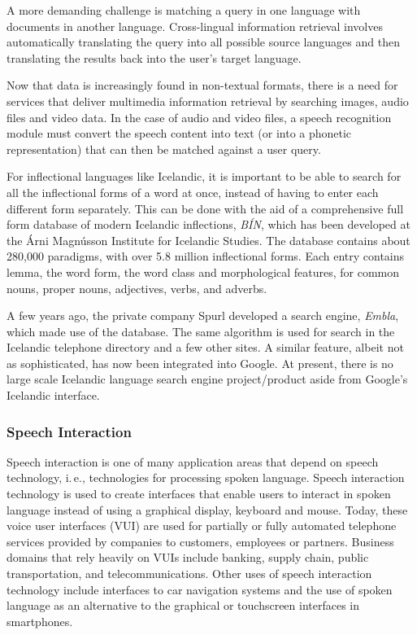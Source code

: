 \documentclass{../../metanetpaper}
\begin{document}
\begin{multicols}{2}
A more demanding challenge is matching a query in one language with documents in another language. Cross-lingual information retrieval involves automatically translating the query into all possible source languages and then translating the results back into the user's target language.

Now that data is increasingly found in non-textual formats, there is a need for services that deliver multimedia information retrieval by searching images, audio files and video data. In the case of audio and video files, a speech recognition module must convert the speech content into text (or into a phonetic representation) that can then be matched against a user query.

For inflectional languages like Icelandic, it is important to be able to search for all the inflectional forms of a word at once, instead of having to enter each different form separately. This can be done with the aid of a comprehensive full form database of modern Icelandic inflections, \textit{BÍN}\cite{bin1}, which has been developed at the Árni Magnússon Institute for Icelandic Studies. The database contains about 280,000 paradigms, with over 5.8 million inflectional forms. Each entry contains lemma, the word form, the word class and morphological features, for common nouns, proper nouns, adjectives, verbs, and adverbs.

A few years ago, the private company Spurl developed a search engine, \textit{Embla}, which made use of the database. The same algorithm is used for search in the Icelandic telephone directory and a few other sites. A similar feature, albeit not as sophisticated, has now been integrated into Google. At present, there is no large scale Icelandic language search engine project/product aside from Google’s Icelandic interface.

\subsubsection{Speech Interaction}

Speech interaction is one of many application areas that depend on speech technology, i.\,e., technologies for processing spoken language. Speech interaction technology is used to create interfaces that enable users to interact in spoken language instead of using a graphical display, keyboard and mouse.  Today, these voice user interfaces (VUI) are used for partially or fully automated telephone services provided by companies to customers, employees or partners. Business domains that rely heavily on VUIs include banking, supply chain, public transportation, and telecommunications. Other uses of speech interaction technology include interfaces to car navigation systems and the use of spoken language as an alternative to the graphical or touchscreen interfaces in smartphones.


\end{multicols}
\end{document}
